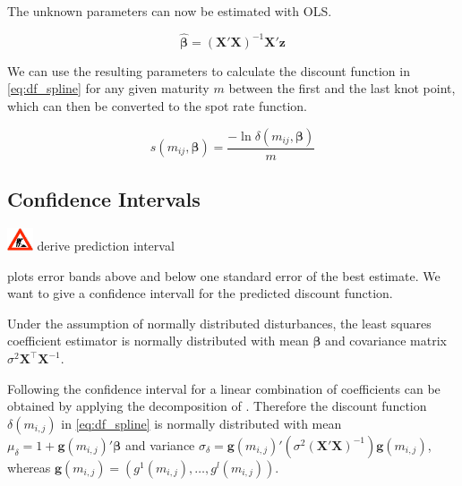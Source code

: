        
The unknown parameters can now be estimated with OLS.
	
\begin{equation}
\label{eq:paramspline}
\bm{\hat \beta}= \left( \bm{X}' \bm{X}\right )^{-1}\bm{X}' \bm{z}
\end{equation}


We can use the resulting parameters to calculate the discount function in \eqref{eq:df_spline} for any given maturity $m$ between the first and the last knot point, which can then be converted to the spot rate function.



\begin{equation}
  \label{eq:transformdf}
  s(m_{ij},\bm{\beta}) = \frac{-\ln \delta(m_{ij},\bm{\beta})}{m}
\end{equation}


\subsection{Confidence Intervals}\includegraphics[width=0.3in]{baustelle} derive prediction interval



\cite{McCulloch1975} plots error bands above and below one standard error of the best estimate. We want to give a confidence intervall for the predicted discount function.

Under the assumption of normally distributed disturbances, the least squares coefficient estimator is normally distributed with mean $\bm{\beta}$ and covariance matrix $\sigma^2\bm{X^\top}\bm{X}^{-1}$. 

Following \cite{Greene2002} the confidence interval for a linear combination of coefficients can be obtained by
applying the decomposition of \cite{Oaxaca1973}. 
Therefore the discount function $\delta(m_{i,j})$ in \eqref{eq:df_spline} is normally distributed with mean $\mu_{\delta}= 1+\bm{g}(m_{i,j})'\bm{\beta}$ and
variance $\sigma_{\delta} = \bm{g}(m_{i,j})'\left(\sigma^2(\bm{X' X})^{-1} \right)\bm{g}(m_{i,j})$, whereas $\bm{g}(m_{i,j})= \left(g^1(m_{i,j}), \dots, g^l(m_{i,j}) \right)$.





